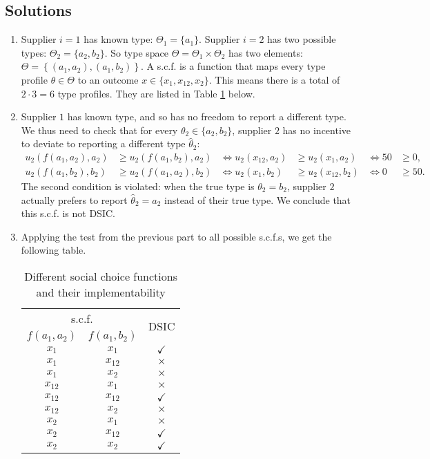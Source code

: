 \documentclass[a4paper]{article}
\begin{document}
\subsection*{Solutions}
\begin{enumerate}
	\item Supplier $i=1$ has known type: $\Theta_1 = \{a_1\}$. Supplier $i=2$ has two possible types: $\Theta_2 = \{a_2, b_2\}$. So type space $\Theta = \Theta_1 \times \Theta_2$ has two elements: $\Theta = \left\{ (a_1,a_2), (a_1,b_2) \right\}$.
	A s.c.f. is a function that maps every type profile $\theta \in \Theta$ to an outcome $x \in \{x_1, x_{12}, x_2\}$. This means there is a total of $2 \cdot 3 = 6$ type profiles. They are listed in Table \ref{tab:supplier_scfs} below.
	
	\item Supplier $1$ has known type, and so has no freedom to report a different type. We thus need to check that for every $\theta_2 \in \{a_2, b_2\}$, supplier $2$ has no incentive to deviate to reporting a different type $\hat{\theta}_2$:
	\begin{align*}
		u_2\left( f(a_1, a_2), a_2 \right) &\geq u_2\left( f(a_1, b_2), a_2 \right)
		& \iff u_2\left( x_{12}, a_2 \right) &\geq u_2\left( x_1, a_2 \right)
		& \iff 50 & \geq 0,
		& 
		\\
		u_2\left( f(a_1, b_2), b_2 \right) &\geq u_2\left( f(a_1, a_2), b_2 \right)
		& \iff u_2\left( x_1, b_2 \right) &\geq u_2\left( x_{12}, b_2 \right)
		& \iff 0 & \geq 50.& 
	\end{align*}
	The second condition is violated: when the true type is $\theta_2 = b_2$, supplier $2$ actually prefers to report $\hat{\theta}_2 = a_2$ instead of their true type. We conclude that this s.c.f. is not DSIC.
	
	\item Applying the test from the previous part to all possible s.c.f.s, we get the following table.
	\begin{table}[h]
		\centering
		\begin{tabular}{c|c|c}
			\multicolumn{2}{c|}{s.c.f.} & \multirow{2}{*}{DSIC}
			\\ \cline{1-2}
			$f(a_1, a_2)$ & $f(a_1, b_2)$ &
			\\ \hline 
			$x_{1}$ & $x_{1}$ & $\checkmark$
			\\
			$x_{1}$ & $x_{12}$ & $\times$
			\\
			$x_{1}$ & $x_{2}$ & $\times$
			\\
			$x_{12}$ & $x_{1}$ & $\times$
			\\
			$x_{12}$ & $x_{12}$ & $\checkmark$
			\\
			$x_{12}$ & $x_{2}$ & $\times$
			\\
			$x_{2}$ & $x_{1}$ & $\times$
			\\
			$x_{2}$ & $x_{12}$ & $\checkmark$
			\\
			$x_{2}$ & $x_{2}$ & $\checkmark$
		\end{tabular}
		\caption{Different social choice functions and their implementability \label{tab:supplier_scfs}}
	\end{table}
	

\end{enumerate}
\end{document}
